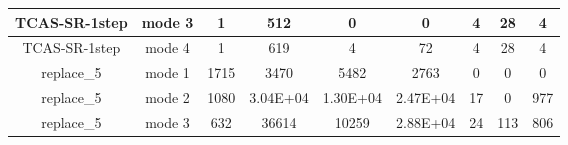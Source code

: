 \begin{table}[]
\begin{tabular}{@{}ccccccccc@{}}
        TCAS-SR-1step                                               & mode 3                                                       & 1                                                          & 512                                                          & 0                                                              & 0                                                                      & 4                                                             & 28                                                                     & 4        \\ \midrule
        TCAS-SR-1step                                               & mode 4                                                       & 1                                                          & 619                                                          & 4                                                              & 72                                                                     & 4                                                             & 28                                                                     & 4        \\ \midrule
        replace\_5                                                  & mode 1                                                       & 1715                                                       & 3470                                                         & 5482                                                           & 2763                                                                   & 0                                                             & 0                                                                      & 0        \\ \midrule
        replace\_5                                                  & mode 2                                                       & 1080                                                       & 3.04E+04                                                     & 1.30E+04                                                       & 2.47E+04                                                               & 17                                                            & 0                                                                      & 977      \\ \midrule
        replace\_5                                                  & mode 3                                                       & 632                                                        & 36614                                                        & 10259                                                          & 2.88E+04                                                               & 24                                                            & 113                                                                    & 806      \\ \midrule

\end{tabular}
\end{table}
